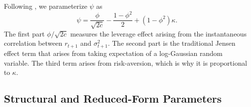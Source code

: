 Following \textcite{han2018leverage}, we parameterize $\psi$ as 
%
\begin{equation}
    \label{eqn:leverage restriction}
    \psi = \frac{\phi}{\sqrt{2c}} - \frac{1 - \phi^2}{2} + (1-\phi^2) \kappa.
\end{equation}
%
The first part $\phi / \sqrt{2 c}$ measures the leverage effect arising from the instantaneous correlation between $r_{t+1}$ and $\sigma^2_{t+1}$. 
The second part is the traditional Jensen effect term that arises from taking expectation of a log-Gaussian random variable.  The third term arises from risk-aversion, which is why it is proportional to $\kappa$.
%


\subsection{Structural and Reduced-Form Parameters}

